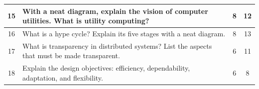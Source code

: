 \documentclass[11pt,a4paper]{article}
\begin{document}
\begin{center}
\begin{tabularx}{\linewidth}{|c|X|c|c|}
15 & With a neat diagram, explain the vision of computer utilities. What is utility computing? & 8 & 12 \\ \hline
16 & What is a hype cycle? Explain its five stages with a neat diagram. & 8 & 13 \\ \hline
17 & What is transparency in distributed systems? List the aspects that must be made transparent. & 6 & 11 \\ \hline
18 & Explain the design objectives: efficiency, dependability, adaptation, and flexibility. & 6 & 8 \\ \hline
\end{tabularx}
\end{center}
\end{document}
